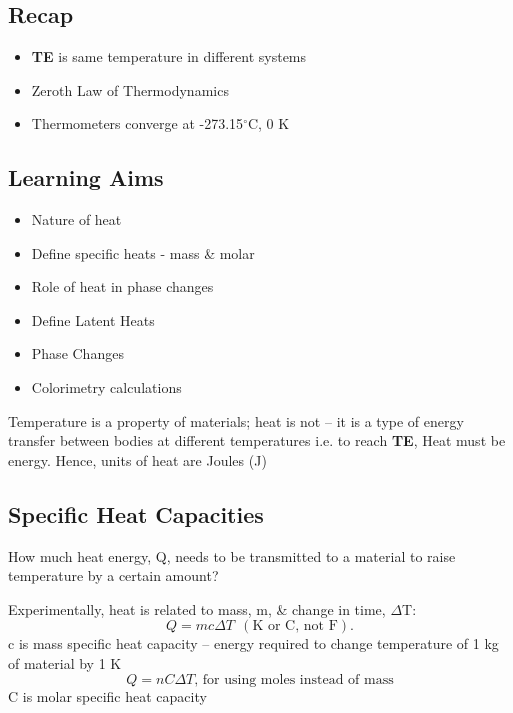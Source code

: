 \documentclass[a4paper, 11pt, normalem]{report}
\begin{document}
\chapter{}
\section{Recap}
\begin{itemize}
    \item \textbf{TE} is same temperature in different systems 
    \item Zeroth Law of Thermodynamics 
    \item Thermometers converge at -273.15{$^\circ$}C, 0 K
\end{itemize}

\section{Learning Aims}
\begin{itemize}
    \item Nature of heat
    \item Define specific heats - mass \& molar
    \item Role of heat in phase changes
    \item Define Latent Heats
    \item Phase Changes
    \item Colorimetry calculations
\end{itemize}
Temperature is a property of materials; heat is not -- it is a type of energy transfer between bodies at different temperatures i.e. to reach \textbf{TE},
Heat must be energy. Hence, units of heat are Joules (J)

\section{Specific Heat Capacities}
How much heat energy, Q, needs to be transmitted to a material to raise temperature by a certain amount?

Experimentally, heat is related to mass, m, \& change in time, ${\Delta}$T:
\begin{equation}
    Q = mc{\Delta}T ~~(\text{K or C, not F}).
\end{equation}
c is mass specific heat capacity -- energy required to change temperature of 1 kg of material by 1 K
\begin{equation}
    Q = nC{\Delta}T\text{, for using moles instead of mass}
\end{equation}
C is molar specific heat capacity
\end{document}
